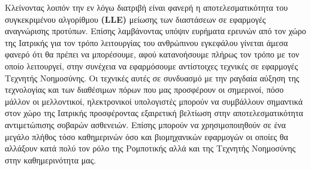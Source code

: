 Κλείνοντας λοιπόν την εν λόγω διατριβή είναι φανερή η αποτελεσματικότητα του συγκεκριμένου αλγορίθμου \textbf{(\textlatin{LLE})} μείωσης των διαστάσεων σε εφαρμογές αναγνώρισης προτύπων. Επίσης λαμβάνοντας υπόψιν ευρήματα ερευνών από τον χώρο της Ιατρικής για τον τρόπο λειτουργίας του ανθρώπινου εγκεφάλου γίνεται άμεσα φανερό ότι θα πρέπει να μπορέσουμε, αφού κατανοήσουμε πλήρως τον τρόπο με τον οποίο λειτουργεί, στην συνέχεια να εφαρμόσουμε αντίστοιχες τεχνικές σε εφαρμογές Τεχνητής Νοημοσύνης. Οι τεχνικές αυτές σε συνδυασμό με την ραγδαία αύξηση της τεχνολογίας και των διαθέσιμων πόρων που μας προσφέρουν οι σημερινοί, πόσο μάλλον οι μελλοντικοί, ηλεκτρονικοί υπολογιστές μπορούν να συμβάλλουν σημαντικά στον χώρο της Ιατρικής προσφέροντας εξαιρετική βελτίωση στην αποτελεσματικότητα αντιμετώπισης σοβαρών ασθενειών. Επίσης μπορούν να χρησιμοποιηθούν σε ένα μεγάλο πλήθος τόσο καθημερινών όσο και βιομηχανικών εφαρμογών οι οποίες θα αλλάξουν κατά πολύ τον ρόλο της Ρομποτικής αλλά και της Τεχνητής Νοημοσύνης στην καθημερινότητα μας.
